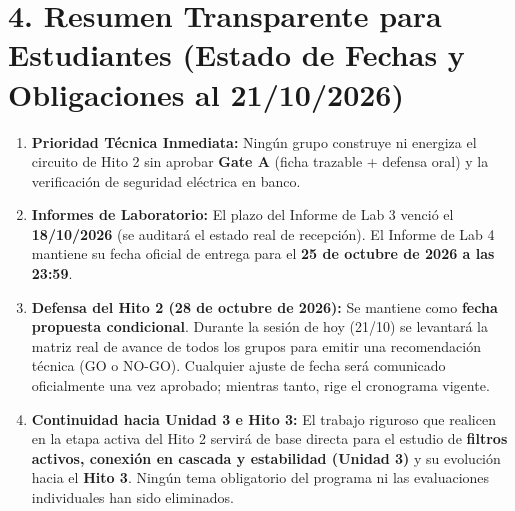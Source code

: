 \documentclass[10pt, a4paper, landscape]{article}
\begin{document}
\section*{4. Resumen Transparente para Estudiantes (Estado de Fechas y Obligaciones al 21/10/2026)}
\begin{tcolorbox}[colback=neutralbg, colframe=ucbblue, title=\textbf{Comunicado Académico de Progresión y Reglas Vigentes}]
    \footnotesize
    \begin{enumerate}
        \setlength{\itemsep}{2pt}
        \item \textbf{Prioridad Técnica Inmediata:} Ningún grupo construye ni energiza el circuito de Hito 2 sin aprobar \textbf{Gate A} (ficha trazable + defensa oral) y la verificación de seguridad eléctrica en banco.
        \item \textbf{Informes de Laboratorio:} El plazo del Informe de Lab 3 venció el \textbf{18/10/2026} (se auditará el estado real de recepción). El Informe de Lab 4 mantiene su fecha oficial de entrega para el \textbf{25 de octubre de 2026 a las 23:59}.
        \item \textbf{Defensa del Hito 2 (28 de octubre de 2026):} Se mantiene como \textbf{fecha propuesta condicional}. Durante la sesión de hoy (21/10) se levantará la matriz real de avance de todos los grupos para emitir una recomendación técnica ({\ttfamily GO} o {\ttfamily NO-GO}). Cualquier ajuste de fecha será comunicado oficialmente una vez aprobado; mientras tanto, rige el cronograma vigente.
        \item \textbf{Continuidad hacia Unidad 3 e Hito 3:} El trabajo riguroso que realicen en la etapa activa del Hito 2 servirá de base directa para el estudio de \textbf{filtros activos, conexión en cascada y estabilidad (Unidad 3)} y su evolución hacia el \textbf{Hito 3}. Ningún tema obligatorio del programa ni las evaluaciones individuales han sido eliminados.
    \end{enumerate}
\end{tcolorbox}
\end{document}

